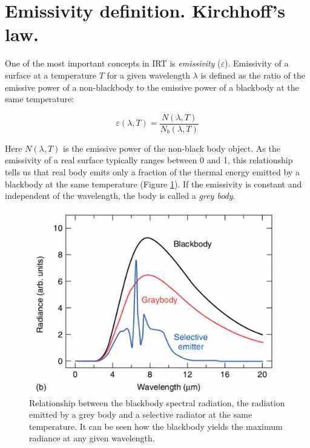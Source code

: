 	\section{Emissivity definition. Kirchhoff's law.}\label{section1.3}
		
		One of the most important concepts in IRT is \textit{emissivity} ($\varepsilon$). Emissivity of a surface at a temperature $T$ for a given wavelength $\lambda$ is defined as the ratio of the emissive power of a  non-blackbody to the emissive power of a blackbody at the same temperature:
		
		\begin{equation}\label{eq1.4}
			\varepsilon(\lambda,T)=\frac{N(\lambda,T)}{N_{b}(\lambda,T)}
		\end{equation}\bigskip
		
		Here $N(\lambda,T)$ is the emissive power of the non-black body object. As the emissivity of a real surface typically ranges between 0 and 1, this relationship tells us that real body emits only a fraction of the thermal energy emitted by a blackbody at the same temperature (Figure \ref{fig1.4}). If the emissivity is constant and independent of the wavelength, the body is called a \textit{grey body}.
		
		\begin{figure}[ht!]
			\centering
			\captionsetup{justification=centering,margin=2cm}
			\includegraphics[scale=0.4]{Figures/Chapter01/BlackAndGreybodyComparison.jpg}
			\caption{Relationship between the blackbody spectral radiation, the radiation emitted by a grey body and a selective radiator at the same temperature. It can be seen how the blackbody yields the maximum radiance at any given wavelength.}\label{fig1.4}
		\end{figure}
		
